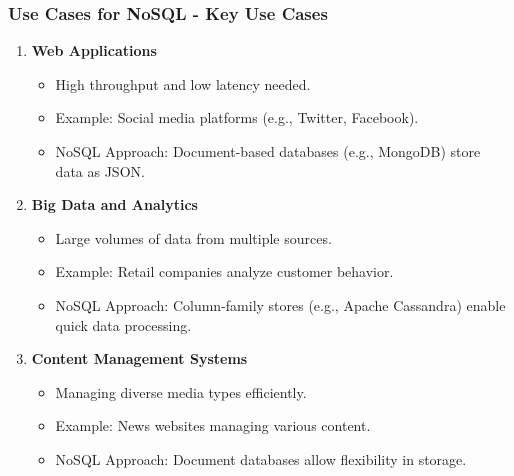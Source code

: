 \documentclass[aspectratio=169]{beamer}
\begin{document}
\begin{frame}[fragile]
    \frametitle{Use Cases for NoSQL - Key Use Cases}
    \begin{enumerate}
        \item \textbf{Web Applications}
          \begin{itemize}
              \item High throughput and low latency needed.
              \item Example: Social media platforms (e.g., Twitter, Facebook).
              \item NoSQL Approach: Document-based databases (e.g., MongoDB) store data as JSON.
          \end{itemize}
        
        \item \textbf{Big Data and Analytics}
          \begin{itemize}
              \item Large volumes of data from multiple sources.
              \item Example: Retail companies analyze customer behavior.
              \item NoSQL Approach: Column-family stores (e.g., Apache Cassandra) enable quick data processing.
          \end{itemize}

        \item \textbf{Content Management Systems}
          \begin{itemize}
              \item Managing diverse media types efficiently.
              \item Example: News websites managing various content.
              \item NoSQL Approach: Document databases allow flexibility in storage.
          \end{itemize}
    \end{enumerate}
\end{frame}
\end{document}

